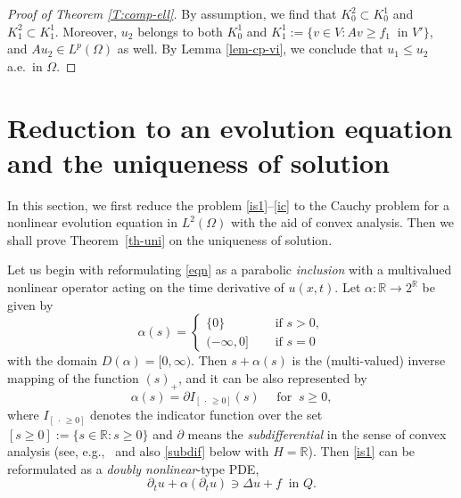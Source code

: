 \documentclass[reqno,10pt]{amsart}
\begin{document}
\begin{proof}[Proof of Theorem \ref{T:comp-ell}]
 By assumption, we find that $K^2_0 \subset K^1_0$ and $K^2_1 \subset
 K^1_1$. Moreover, $u_2$ belongs to both $K^1_0$ and $K^1_1 := \{v \in V
 \colon Av \geq f_1 \ \mbox{ in } V'\}$, and $A u_2 \in
 L^p(\Omega)$ as well. By Lemma \ref{lem-cp-vi}, we conclude that $u_1 \leq u_2$
 a.e.~in $\Omega$.
\end{proof} 

\section{Reduction to an evolution equation and the uniqueness of
 solution}\label{sec-uni}

In this section, we first reduce the problem \eqref{is1}--\eqref{ic} to
the Cauchy problem for a nonlinear evolution equation in $L^2(\Omega)$
with the aid of convex analysis. Then we shall prove
Theorem~\ref{th-uni} on the uniqueness of solution.

 Let us begin with reformulating \eqref{eqn} as a parabolic
 \emph{inclusion} with a multivalued nonlinear operator acting on the
 time derivative of $u(x,t)$. Let $\alpha : \mathbb R \to 2^{\mathbb R}$ be
 given by 
\begin{equation}\label{alpha}
 \alpha(s) = \begin{cases}
	      \{0\} \quad &\mbox{ if } s > 0,\\
	      (-\infty,0] \quad &\mbox{ if } s = 0
	     \end{cases}
 \end{equation}
 with the domain $D(\alpha) = [0,\infty)$. 
 Then $s + \alpha(s)$ is the (multi-valued) inverse mapping of the
 function $(s)_+$, and it can be also represented by
 $$
 \alpha(s) = \partial {I_{[~\cdot\, \geq 0]}} (s) \quad \mbox{ for } \ s \geq 0,
 $$
 where ${I_{[~\cdot\, \geq 0]}}$ denotes the indicator function over
 the set $[s \geq 0] := \{ s \in \mathbb R \colon s \geq 0\}$
 and $\partial$ means the \emph{subdifferential} in the sense of
 convex analysis (see, e.g.,~\cite{Bre73} and also \eqref{subdif} below with
 $H = {{\mathbb R}}$). Then \eqref{is1} can be reformulated as a
 \emph{doubly nonlinear}-type PDE,
 \begin{equation}\label{dnp}
  \partial_t u + \alpha(\partial_t u) \ni \Delta u + f \ \mbox{ in } Q.
 \end{equation}
\end{document}
